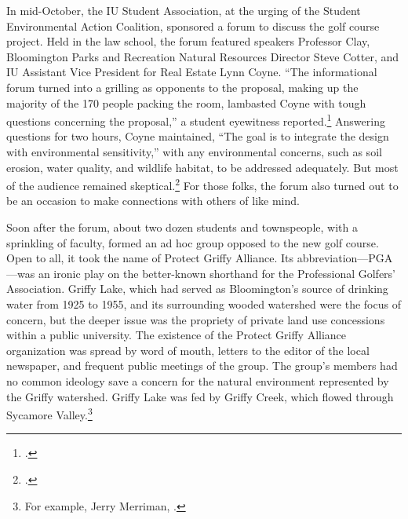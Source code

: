 \documentclass[
  american,
  letterpaper,
]{scrreprt}
\begin{document}
In mid-October, the IU Student Association, at the urging of the Student
Environmental Action Coalition, sponsored a forum to discuss the golf
course project. Held in the law school, the forum featured speakers
Professor Clay, Bloomington Parks and Recreation Natural Resources
Director Steve Cotter, and IU Assistant Vice President for Real Estate
Lynn Coyne. ``The informational forum turned into a grilling as
opponents to the proposal, making up the majority of the 170 people
packing the room, lambasted Coyne with tough questions concerning the
proposal,'' a student eyewitness reported.\footnote{.} Answering questions for two hours, Coyne maintained,
``The goal is to integrate the design with environmental sensitivity,''
with any environmental concerns, such as soil erosion, water quality,
and wildlife habitat, to be addressed adequately. But most of the
audience remained skeptical.\footnote{.} For those folks, the forum
also turned out to be an occasion to make connections with others of
like mind.

Soon after the forum, about two dozen students and townspeople, with a
sprinkling of faculty, formed an ad hoc group opposed to the new golf
course. Open to all, it took the name of Protect Griffy Alliance. Its
abbreviation---PGA---was an ironic play on the better-known shorthand
for the Professional Golfers' Association. Griffy Lake, which had served
as Bloomington's source of drinking water from 1925 to 1955, and its
surrounding wooded watershed were the focus of concern, but the deeper
issue was the propriety of private land use concessions within a public
university. The existence of the Protect Griffy Alliance organization
was spread by word of mouth, letters to the editor of the local
newspaper, and frequent public meetings of the group. The group's
members had no common ideology save a concern for the natural
environment represented by the Griffy watershed. Griffy Lake was fed by
Griffy Creek, which flowed through Sycamore Valley.\footnote{For
  example, Jerry Merriman, .}
\end{document}
